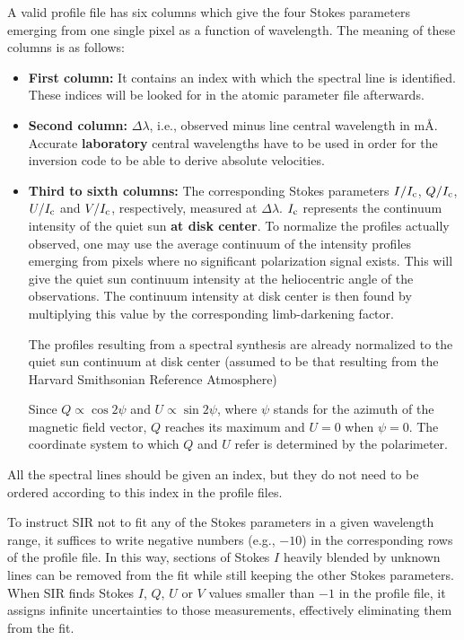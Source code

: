 A valid profile file has six columns which give the four Stokes parameters 
emerging from one single pixel as a function of wavelength. The meaning of 
these columns is as follows:
\begin{itemize}
\item {\bf First column:} It contains an index with which the spectral line is 
identified. These indices will be looked for in the atomic parameter file afterwards. 

\item {\bf Second column:} $\Delta \lambda$, i.e., observed minus line central 
wavelength in m\AA\/. Accurate {\bf laboratory} central wavelengths have to be used
in order for the inversion code to be able to derive absolute velocities.

\item {\bf Third to sixth columns:} The corresponding Stokes parameters
$I/I_{\rm c}$, $Q/I_{\rm c}$, $U/I_{\rm c}$ and $V/I_{\rm c}$,
respectively, measured at $\Delta \lambda$.  $I_{\rm c}$ represents the
continuum intensity of the quiet sun  {\bf at disk center}. To
normalize the profiles actually observed, one may use the average
continuum of the intensity profiles emerging from pixels where no
significant polarization signal exists. This will give the quiet
sun continuum intensity at the heliocentric angle of the observations. 
The continuum intensity at disk center is then found by multiplying this
value by the corresponding limb-darkening factor. 

The profiles resulting from a spectral synthesis are already normalized 
to the quiet sun continuum at disk center (assumed to be that resulting from 
the Harvard Smithsonian Reference Atmosphere)

Since $Q \propto \cos 2\psi$ and $U \propto \sin 2\psi$, where $\psi$ 
stands for the azimuth of the magnetic field vector, $Q$ reaches its 
maximum and $U =0$ when $\psi =0$. The coordinate system to which
$Q$ and $U$ refer is determined by the polarimeter. 


\end{itemize}

All the spectral lines should be given an index, but they 
do not need to be ordered according to this index in the profile 
files. 

To instruct SIR not to fit any of the Stokes parameters in a
given wavelength range, it suffices to write negative numbers 
(e.g., $-10$) in the corresponding rows of the profile file. In this
way, sections of Stokes $I$ heavily blended by unknown lines can be 
removed from the fit while still keeping the other Stokes parameters. 
When SIR finds Stokes $I$, $Q$, $U$ or $V$ values smaller than $-1$ 
in the profile file, it assigns infinite uncertainties to those 
measurements, effectively eliminating them from the fit. 

